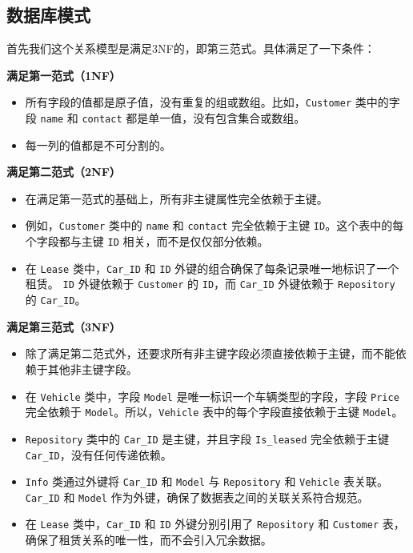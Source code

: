 \documentclass[UTF8,a4paper,12pt]{ctexart}
\begin{document}
\subsection{数据库模式}

首先我们这个关系模型是满足3NF的，即第三范式。具体满足了一下条件：

\textbf{满足第一范式（1NF）}

\begin{itemize}
    \item 所有字段的值都是原子值，没有重复的组或数组。比如，\texttt{Customer} 类中的字段 \texttt{name} 和 \texttt{contact} 都是单一值，没有包含集合或数组。
    \item 每一列的值都是不可分割的。
\end{itemize}

\textbf{满足第二范式（2NF）}

\begin{itemize}
    \item 在满足第一范式的基础上，所有非主键属性完全依赖于主键。
    \item 例如，\texttt{Customer} 类中的 \texttt{name} 和 \texttt{contact} 完全依赖于主键 \texttt{ID}。这个表中的每个字段都与主键 \texttt{ID} 相关，而不是仅仅部分依赖。
    \item 在 \texttt{Lease} 类中，\texttt{Car\_ID} 和 \texttt{ID} 外键的组合确保了每条记录唯一地标识了一个租赁。 \texttt{ID} 外键依赖于 \texttt{Customer} 的 \texttt{ID}，而 \texttt{Car\_ID} 外键依赖于 \texttt{Repository} 的 \texttt{Car\_ID}。
\end{itemize}

\textbf{满足第三范式（3NF）}

\begin{itemize}
    \item 除了满足第二范式外，还要求所有非主键字段必须直接依赖于主键，而不能依赖于其他非主键字段。
    \item 在 \texttt{Vehicle} 类中，字段 \texttt{Model} 是唯一标识一个车辆类型的字段，字段 \texttt{Price} 完全依赖于 \texttt{Model}。所以，\texttt{Vehicle} 表中的每个字段直接依赖于主键 \texttt{Model}。
    \item \texttt{Repository} 类中的 \texttt{Car\_ID} 是主键，并且字段 \texttt{Is\_leased} 完全依赖于主键 \texttt{Car\_ID}，没有任何传递依赖。
    \item \texttt{Info} 类通过外键将 \texttt{Car\_ID} 和 \texttt{Model} 与 \texttt{Repository} 和 \texttt{Vehicle} 表关联。 \texttt{Car\_ID} 和 \texttt{Model} 作为外键，确保了数据表之间的关联关系符合规范。
    \item 在 \texttt{Lease} 类中，\texttt{Car\_ID} 和 \texttt{ID} 外键分别引用了 \texttt{Repository} 和 \texttt{Customer} 表，确保了租赁关系的唯一性，而不会引入冗余数据。
\end{itemize}
\end{document}
